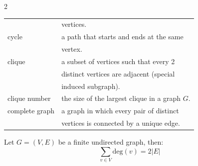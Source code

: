 \documentclass[5pt]{article}
\begin{document}
\begin{multicols}{2}
\begin{tabular}{ll}
                        & vertices.\\
    cycle               & a path that starts and ends at the same\\
                        & vertex.\\
    clique              & a subset of vertices such that every 2 \\
                        & distinct vertices are adjacent (special \\
                        & induced subgraph).\\
    clique number       & the size of the largest clique in a graph $G$.\\
    complete graph      & a graph in which every pair of distinct\\
                        & vertices is connected by a unique edge.\\
    \end{tabular}
    \begin{lemma}
        Let $G=(V,E)$ be a finite undirected graph, then:
        \[
        \sum_{v \in V} \text{deg}(v) = 2|E|
        \]
    \end{lemma}


\end{multicols}
\end{document}
